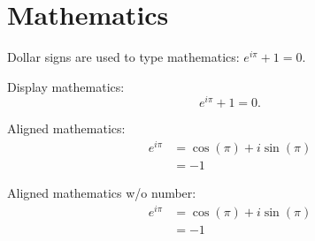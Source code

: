 \section{Mathematics}

Dollar signs are used to type mathematics:
$e^{i\pi}+1=0$.

Display mathematics:
$$
e^{i\pi}+1=0.
$$   \cite{9783639174304}

Aligned mathematics:
\begin{align}
    e^{i\pi}&=\cos(\pi)+i\sin(\pi)\\
    &= -1 %
\end{align}

Aligned mathematics w/o number:
\begin{align*}
    e^{i\pi}&=\cos(\pi)+i\sin(\pi)\\
    &= -1 %
\end{align*}
